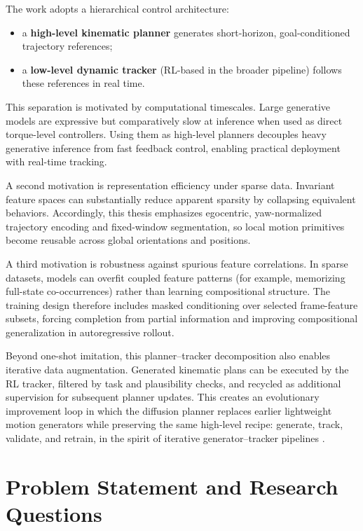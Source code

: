 The work adopts a hierarchical control architecture:
\begin{itemize}
    \item a \textbf{high-level kinematic planner} generates short-horizon, goal-conditioned trajectory references;
    \item a \textbf{low-level dynamic tracker} (RL-based in the broader pipeline) follows these references in real time.
\end{itemize}

This separation is motivated by computational timescales. Large generative models are expressive but comparatively slow at inference when used as direct torque-level controllers. Using them as high-level planners decouples heavy generative inference from fast feedback control, enabling practical deployment with real-time tracking.

A second motivation is representation efficiency under sparse data. Invariant feature spaces can substantially reduce apparent sparsity by collapsing equivalent behaviors. Accordingly, this thesis emphasizes egocentric, yaw-normalized trajectory encoding and fixed-window segmentation, so local motion primitives become reusable across global orientations and positions.

A third motivation is robustness against spurious feature correlations. In sparse datasets, models can overfit coupled feature patterns (for example, memorizing full-state co-occurrences) rather than learning compositional structure. The training design therefore includes masked conditioning over selected frame-feature subsets, forcing completion from partial information and improving compositional generalization in autoregressive rollout.

Beyond one-shot imitation, this planner--tracker decomposition also enables iterative data augmentation. Generated kinematic plans can be executed by the RL tracker, filtered by task and plausibility checks, and recycled as additional supervision for subsequent planner updates. This creates an evolutionary improvement loop in which the diffusion planner replaces earlier lightweight motion generators while preserving the same high-level recipe: generate, track, validate, and retrain, in the spirit of iterative generator--tracker pipelines \cite{xu2025parc}.

\section{Problem Statement and Research Questions}

